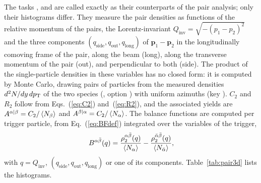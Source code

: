 The tasks ,  and  are
called exactly as their counterparts of the pair analysis; only their histograms differ. They measure the pair
densities as functions of the relative momentum of the pairs, the Lorentz-invariant
$Q_{\mathrm{inv}} = \sqrt{-(p_1-p_2)^2}$ and the three components $(q_{\mathrm{side}}, q_{\mathrm{out}}, q_{\mathrm{long}})$
of $\mathbf{p}_1-\mathbf{p}_2$ in the longitudinally comoving frame of the pair, along the beam (long), along the
transverse momentum of the pair (out), and perpendicular to both (side). The product of the single-particle densities
in these variables has no closed form: it is computed by Monte Carlo, drawing pairs of particles from the measured
densities $d^2N/dy\,dp_{\mathrm{T}}$ of the two species (, option ) with uniform azimuths
(key ). $C_2$ and $R_2$ follow from Eqs.~(\ref{eq:C2}) and~(\ref{eq:R2}), and the associated yields
are $A^{\alpha|\beta} = C_2/\left\langle N_\beta \right\rangle$ and $A^{\beta|\alpha}=C_2/\left\langle N_\alpha \right\rangle$. The balance functions are
computed per trigger particle, from Eq.~(\ref{eq:BFdef}) integrated over the variables of the trigger,
\begin{equation}
  B^{\alpha\bar\beta}(q) = \frac{\rho_2^{\alpha\bar\beta}(q)}{\left\langle N_\alpha \right\rangle} - \frac{\rho_2^{\bar\alpha\bar\beta}(q)}{\left\langle N_{\bar\alpha} \right\rangle},
\end{equation}
with $q = Q_{\mathrm{inv}}$, $(q_{\mathrm{side}},q_{\mathrm{out}},q_{\mathrm{long}})$ or one of its components.
Table~\ref{tab:pair3d} lists the histograms.

